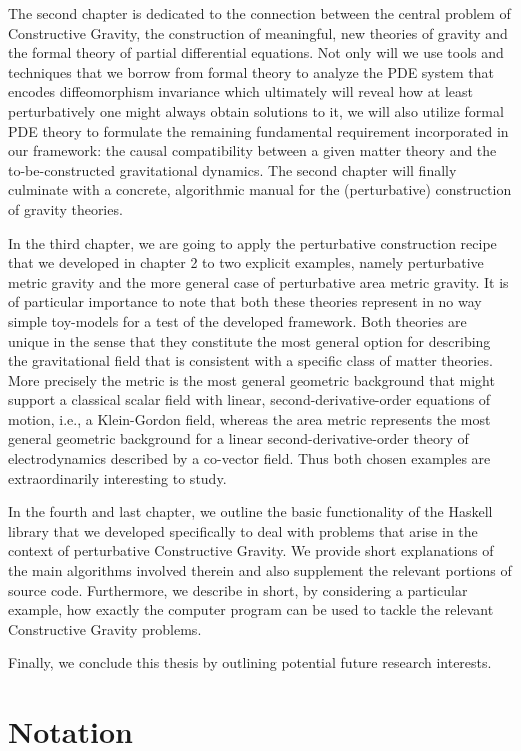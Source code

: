 The second chapter is dedicated to the connection between the central problem of Constructive Gravity, the construction of meaningful, new theories of gravity and the formal theory of partial differential equations. Not only will we use tools and techniques that we borrow from formal theory to analyze the PDE system that encodes diffeomorphism invariance which ultimately will reveal how at least perturbatively one might always obtain solutions to it, we will also utilize formal PDE theory to formulate the remaining fundamental requirement incorporated in our framework: the causal compatibility between a given matter theory and the to-be-constructed gravitational dynamics. The second chapter will finally culminate with a concrete, algorithmic manual for the (perturbative) construction of gravity theories.  

In the third chapter, we are going to apply the perturbative construction recipe that we developed in chapter 2 to two explicit examples, namely perturbative metric gravity and the more general case of perturbative area metric gravity. It is of particular importance to note that both these theories represent in no way simple toy-models for a test of the developed framework. Both theories are unique in the sense that they constitute the most general option for describing the gravitational field that is consistent with a specific class of matter theories. More precisely the metric is the most general geometric background that might support a classical scalar field with linear, second-derivative-order equations of motion, i.e., a Klein-Gordon field, whereas the area metric represents the most general geometric background for a linear second-derivative-order theory of electrodynamics described by a co-vector field. Thus both chosen examples are extraordinarily interesting to study.

In the fourth and last chapter, we outline the basic functionality of the Haskell library that we developed specifically to deal with problems that arise in the context of perturbative Constructive Gravity. We provide short explanations of the main algorithms involved therein and also supplement the relevant portions of source code. Furthermore, we describe in short, by considering a particular example, how exactly the computer program can be used to tackle the relevant Constructive Gravity problems.

Finally, we conclude this thesis by outlining potential future research interests.

\section*{Notation}

